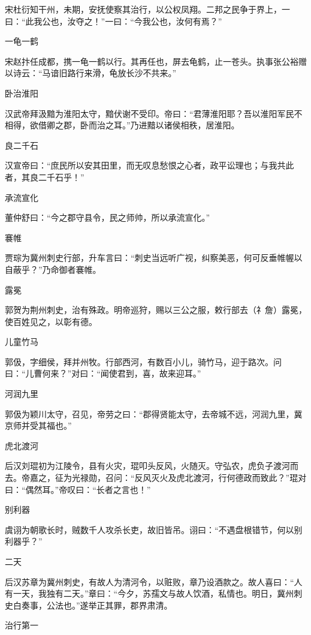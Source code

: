 \documentclass[a4paper,12pt,UTF8,twoside]{ctexbook}
\begin{document}
    宋杜衍知干州，未期，安抚使察其治行，以公权凤翔。二邦之民争于界上，一曰：“此我公也，汝夺之！”一曰：“今我公也，汝何有焉？”
    
    一龟一鹤
    
    宋赵抃任成都，携一龟一鹤以行。其再任也，屏去龟鹤，止一苍头。执事张公裕赠以诗云：“马谙旧路行来滑，龟放长沙不共来。”
    
    卧治淮阳
    
    汉武帝拜汲黯为淮阳太守，黯伏谢不受印。帝曰：“君薄淮阳耶？吾以淮阳军民不相得，欲借卿之郡，卧而治之耳。”乃进黯以诸侯相秩，居淮阳。
    
    良二千石
    
    汉宣帝曰：“庶民所以安其田里，而无叹息愁恨之心者，政平讼理也；与我共此者，其良二千石乎！”
    
    承流宣化
    
    董仲舒曰：“今之郡守县令，民之师帅，所以承流宣化。”
    
    褰帷
    
    贾琮为冀州刺史行部，升车言曰：“刺史当远听广视，纠察美恶，何可反垂帷幄以自蔽乎？”乃命御者褰帷。
    
    露冕
    
    郭贺为荆州刺史，治有殊政。明帝巡狩，赐以三公之服，敕行部去（礻詹）露冕，使百姓见之，以彰有德。
    
    儿童竹马
    
    郭伋，字细侯，拜并州牧。行部西河，有数百小儿，骑竹马，迎于路次。问曰：“儿曹何来？”对曰：“闻使君到，喜，故来迎耳。”
    
    河润九里
    
    郭伋为颖川太守，召见，帝劳之曰：“郡得贤能太守，去帝城不远，河润九里，冀京师并受其福也。”
    
    虎北渡河
    
    后汉刘琨初为江陵令，县有火灾，琨叩头反风，火随灭。守弘农，虎负子渡河而去。帝嘉之，征为光禄勋，召问：“反风灭火及虎北渡河，行何德政而致此？”琨对曰：“偶然耳。”帝叹曰：“长者之言也！”
    
    别利器
    
    虞诩为朝歌长时，贼数千人攻杀长吏，故旧皆吊。诩曰：“不遇盘根错节，何以别利器乎？”
    
    二天
    
    后汉苏章为冀州刺史，有故人为清河令，以赃败，章乃设酒款之。故人喜曰：“人有一天，我独有二天。”章曰：“今夕，苏孺文与故人饮酒，私情也。明日，冀州刺史白奏事，公法也。”遂举正其罪，郡界肃清。
    
    治行第一
    
\end{document}
